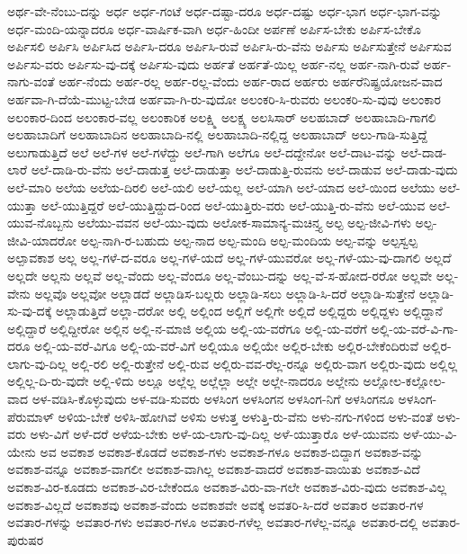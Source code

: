 {ಅರ್ಥ-ವೇ-ನೆಂಬು-ದನ್ನು
ಅರ್ಧ
ಅರ್ಧ-ಗಂಟೆ
ಅರ್ಧ-ದಷ್ಟಾ-ದರೂ
ಅರ್ಧ-ದಷ್ಟು
ಅರ್ಧ-ಭಾಗ
ಅರ್ಧ-ಭಾಗ-ವನ್ನು
ಅರ್ಧ-ಮಂದಿ-ಯನ್ನಾದರೂ
ಅರ್ಧ-ವಾರ್ಷಿಕ-ವಾಗಿ
ಅರ್ಧ-ಹಿಂದೀ
ಅರ್ಪಣೆ
ಅರ್ಪಿಸ-ಬೇಕು
ಅರ್ಪಿಸ-ಬೇಕೊ
ಅರ್ಪಿಸಲಿ
ಅರ್ಪಿಸಿ
ಅರ್ಪಿಸಿದ
ಅರ್ಪಿಸಿ-ದರೂ
ಅರ್ಪಿಸಿ-ರುವೆ
ಅರ್ಪಿಸಿ-ರು-ವೆನು
ಅರ್ಪಿಸು
ಅರ್ಪಿಸುತ್ತೇನೆ
ಅರ್ಪಿಸುವ
ಅರ್ಪಿಸು-ವರು
ಅರ್ಪಿಸು-ವು-ದಕ್ಕೆ
ಅರ್ಪಿಸು-ವುದು
ಅರ್ಹತೆ
ಅರ್ಹತೆ-ಯಿಲ್ಲ
ಅರ್ಹ-ನಲ್ಲ
ಅರ್ಹ-ನಾಗಿ-ರುವೆ
ಅರ್ಹ-ನಾಗು-ವಂತೆ
ಅರ್ಹ-ನೆಂದು
ಅರ್ಹ-ರಲ್ಲ
ಅರ್ಹ-ರಲ್ಲ-ವೆಂದು
ಅರ್ಹ-ರಾದ
ಅರ್ಹರು
ಅರ್ಹರೆನಿಷ್ಪ್ರಯೋಜನ-ವಾದ
ಅರ್ಹವಾ-ಗಿ-ದೆಯೆ-ಮುಟ್ಟ-ಬೇಡ
ಅರ್ಹವಾ-ಗಿ-ರು-ವುದೋ
ಅಲಂಕರಿ-ಸಿ-ರುವರು
ಅಲಂಕರಿ-ಸು-ವುವು
ಅಲಂಕಾರ
ಅಲಂಕಾರ-ದಿಂದ
ಅಲಂಕಾರ-ವಲ್ಲ
ಅಲಂಕಾರಿಕ
ಅಲಕ್ಷ್ಮಿ
ಅಲಕ್ಷ್ಯ
ಅಲಸಿಸಾರ್
ಅಲಹಬಾದ್
ಅಲಹಾಬಾದಿ-ಗಾಗಲಿ
ಅಲಹಾಬಾದಿಗೆ
ಅಲಹಾಬಾದಿನ
ಅಲಹಾಬಾದಿ-ನಲ್ಲಿ
ಅಲಹಾಬಾದಿ-ನಲ್ಲಿದ್ದ
ಅಲಹಾಬಾದ್
ಅಲು-ಗಾಡಿ-ಸುತ್ತಿದ್ದೆ
ಅಲುಗಾಡುತ್ತಿದೆ
ಅಲೆ
ಅಲೆ-ಗಳ
ಅಲೆ-ಗಳೆದ್ದು
ಅಲೆ-ಗಾಗಿ
ಅಲೆಗೂ
ಅಲೆ-ದದ್ದೇನೋ
ಅಲೆ-ದಾಟ-ವನ್ನು
ಅಲೆ-ದಾಡ-ಲಾರೆ
ಅಲೆ-ದಾಡಿ-ರು-ವೆನು
ಅಲೆ-ದಾಡುತ್ತ
ಅಲೆ-ದಾಡುತ್ತಾ
ಅಲೆ-ದಾಡುತ್ತಿ-ರುವನು
ಅಲೆ-ದಾಡುವ
ಅಲೆ-ದಾಡು-ವುದು
ಅಲೆ-ಮಾರಿ
ಅಲೆಯ
ಅಲೆಯ-ದಿರಲಿ
ಅಲೆ-ಯಲಿ
ಅಲೆ-ಯಲ್ಲ
ಅಲೆ-ಯಾಗಿ
ಅಲೆ-ಯಾದ
ಅಲೆ-ಯಿಂದ
ಅಲೆಯು
ಅಲೆ-ಯುತ್ತಾ
ಅಲೆ-ಯುತ್ತಿದ್ದರೆ
ಅಲೆ-ಯುತ್ತಿದ್ದುದ-ರಿಂದ
ಅಲೆ-ಯುತ್ತಿರು-ವರು
ಅಲೆ-ಯುತ್ತಿ-ರು-ವೆನು
ಅಲೆ-ಯುವ
ಅಲೆ-ಯುವ-ನೊಬ್ಬನು
ಅಲೆಯು-ವವನ
ಅಲೆ-ಯು-ವುದು
ಅಲೋಕ-ಸಾಮಾನ್ಯ-ಮಚಿನ್ತ್ಯ
ಅಲ್ಪ
ಅಲ್ಪ-ಜೀವಿ-ಗಳು
ಅಲ್ಪ-ಜೀವಿ-ಯಾದರೋ
ಅಲ್ಪ-ನಾಗಿ-ರ-ಬಹುದು
ಅಲ್ಪ-ನಾದ
ಅಲ್ಪ-ಮಂದಿ
ಅಲ್ಪ-ಮಂದಿಯ
ಅಲ್ಪ-ವನ್ನು
ಅಲ್ಪಸ್ವಲ್ಪ
ಅಲ್ಪಾವಕಾಶ
ಅಲ್ಲ
ಅಲ್ಲ-ಗಳೆ-ದ-ವರೂ
ಅಲ್ಲ-ಗಳೆ-ಯದೆ
ಅಲ್ಲ-ಗಳೆ-ಯುವರೋ
ಅಲ್ಲ-ಗಳೆ-ಯು-ವು-ದಾಗಲಿ
ಅಲ್ಲದೆ
ಅಲ್ಲದೇ
ಅಲ್ಲನು
ಅಲ್ಲವೆ
ಅಲ್ಲ-ವೆಂದು
ಅಲ್ಲ-ವೆಂದೂ
ಅಲ್ಲ-ವೆಂಬು-ದನ್ನು
ಅಲ್ಲ-ವೆ-ಸ-ಹೋದ-ರರೋ
ಅಲ್ಲವೇ
ಅಲ್ಲ-ವೇನು
ಅಲ್ಲವೊ
ಅಲ್ಲವೋ
ಅಲ್ಲಾಡದೆ
ಅಲ್ಲಾಡಿಸ-ಬಲ್ಲರು
ಅಲ್ಲಾಡಿ-ಸಲು
ಅಲ್ಲಾಡಿ-ಸಿ-ದರೆ
ಅಲ್ಲಾಡಿ-ಸುತ್ತೇನೆ
ಅಲ್ಲಾಡಿ-ಸು-ವು-ದಕ್ಕೆ
ಅಲ್ಲಾಡುತ್ತಿದೆ
ಅಲ್ಲಾ-ದರೋ
ಅಲ್ಲಿ
ಅಲ್ಲಿಂದ
ಅಲ್ಲಿಗೆ
ಅಲ್ಲಿಗೇ
ಅಲ್ಲಿದೆ
ಅಲ್ಲಿದ್ದರು
ಅಲ್ಲಿದ್ದಳು
ಅಲ್ಲಿದ್ದಾನೆ
ಅಲ್ಲಿದ್ದಾರೆ
ಅಲ್ಲಿದ್ದೀರೋ
ಅಲ್ಲಿನ
ಅಲ್ಲಿ-ನ-ಮಾಜಿ
ಅಲ್ಲಿಯ
ಅಲ್ಲಿ-ಯ-ವರೆಗೂ
ಅಲ್ಲಿ-ಯ-ವರೆಗೆ
ಅಲ್ಲಿ-ಯ-ವರೆ-ವಿ-ಗಾ-ದರೂ
ಅಲ್ಲಿ-ಯ-ವರೆ-ವಿಗೂ
ಅಲ್ಲಿ-ಯ-ವರೆ-ವಿಗೆ
ಅಲ್ಲಿಯೂ
ಅಲ್ಲಿಯೇ
ಅಲ್ಲಿರ-ಬೇಕು
ಅಲ್ಲಿರ-ಬೇಕೆಂದಿರುವೆ
ಅಲ್ಲಿರ-ಲಾಗು-ವು-ದಿಲ್ಲ
ಅಲ್ಲಿ-ರಲಿ
ಅಲ್ಲಿ-ರುತ್ತೇನೆ
ಅಲ್ಲಿ-ರುವ
ಅಲ್ಲಿರು-ವವ-ರೆಲ್ಲ-ರನ್ನೂ
ಅಲ್ಲಿರು-ವಾಗ
ಅಲ್ಲಿರು-ವುದು
ಅಲ್ಲಿಲ್ಲ
ಅಲ್ಲಿಲ್ಲ-ದಿ-ರು-ವುದೇ
ಅಲ್ಲಿ-ಳಿದು
ಅಲ್ಲೂ
ಅಲ್ಲೆಲ್ಲ
ಅಲ್ಲೆಲ್ಲಾ
ಅಲ್ಲೇ
ಅಲ್ಲೇ-ನಾದರೂ
ಅಲ್ಲೇನು
ಅಲ್ಲೋಲ-ಕಲ್ಲೋಲ-ವಾದ
ಅಳ-ವಡಿಸಿ-ಕೊಳ್ಳುವುದು
ಅಳ-ವಡಿ-ಸುವರು
ಅಳಸಿಂಗ
ಅಳಸಿಂಗನ
ಅಳಸಿಂಗ-ನಿಗೆ
ಅಳಸಿಂಗನೂ
ಅಳಸಿಂಗ-ಪೆರುಮಾಳ್
ಅಳಿಯ-ಬೇಕೆ
ಅಳಿಸಿ-ಹೋಗಿವೆ
ಅಳಿಸು
ಅಳುತ್ತ
ಅಳುತ್ತಿ-ರು-ವೆನು
ಅಳು-ನಗು-ಗಳಿಂದ
ಅಳು-ವಂತೆ
ಅಳು-ವರು
ಅಳು-ವಿಗೆ
ಅಳೆ-ದರೆ
ಅಳೆಯ-ಬೇಕು
ಅಳೆ-ಯ-ಲಾಗು-ವು-ದಿಲ್ಲ
ಅಳೆ-ಯುತ್ತಾರೊ
ಅಳೆ-ಯುವನು
ಅಳೆ-ಯು-ವಿ-ಯೇನು
ಅವ
ಅವಕಾಶ
ಅವಕಾಶ-ಕೊಡದೆ
ಅವಕಾಶ-ಗಳು
ಅವಕಾಶ-ಗಳೂ
ಅವಕಾಶ-ಬಿದ್ದಾಗ
ಅವಕಾಶ-ವನ್ನು
ಅವಕಾಶ-ವನ್ನೂ
ಅವಕಾಶ-ವಾಗಲೀ
ಅವಕಾಶ-ವಾಗಿಲ್ಲ
ಅವಕಾಶ-ವಾದರೆ
ಅವಕಾಶ-ವಾಯಿತು
ಅವಕಾಶ-ವಿದೆ
ಅವಕಾಶ-ವಿರ-ಕೂಡದು
ಅವಕಾಶ-ವಿರ-ಬೇಕೆಂದೂ
ಅವಕಾಶ-ವಿರು-ವಾ-ಗಲೇ
ಅವಕಾಶ-ವಿರು-ವುದು
ಅವಕಾಶ-ವಿಲ್ಲ
ಅವಕಾಶ-ವಿಲ್ಲದೆ
ಅವಕಾಶವು
ಅವಕಾಶ-ವೆಂದು
ಅವಕಾಶವೇ
ಅವಕ್ಕೆ
ಅವತರಿ-ಸಿ-ದರೆ
ಅವತಾರ
ಅವತಾರ-ಗಳ
ಅವತಾರ-ಗಳನ್ನು
ಅವತಾರ-ಗಳು
ಅವತಾರ-ಗಳೂ
ಅವತಾರ-ಗಳೆಲ್ಲ
ಅವತಾರ-ಗಳೆಲ್ಲ-ವನ್ನೂ
ಅವತಾರ-ದಲ್ಲಿ
ಅವತಾರ-ಪುರುಷರ
}
